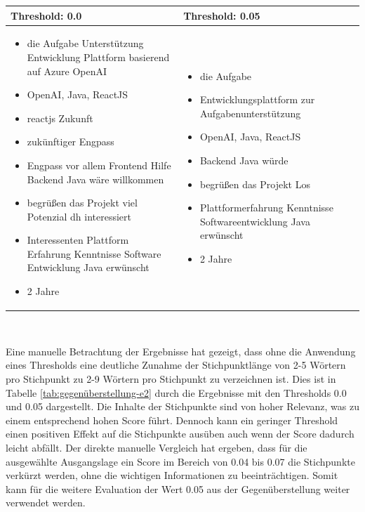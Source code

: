 \begin{center}
	\begin{tabularx}{1\textwidth} { 
			| >{\raggedright\arraybackslash}X 
			|| >{\raggedright\arraybackslash}X | }
		\hline
		Threshold: 0.0
		& Threshold: 0.05 \\
		\hline
		\begin{itemize}[topsep=0pt]
			\itemsep-0.5em
			\item die Aufgabe Unterstützung Entwicklung Plattform basierend auf Azure OpenAI
			\item OpenAI, Java, ReactJS
			\item reactjs Zukunft
			\item zukünftiger Engpass
			\item Engpass vor allem Frontend Hilfe Backend Java wäre willkommen
			\item begrüßen das Projekt viel Potenzial dh interessiert
			\item Interessenten Plattform Erfahrung Kenntnisse Software Entwicklung Java erwünscht
			\item 2 Jahre
		\end{itemize} & \begin{itemize}[topsep=0pt]
		\itemsep-0.5em
		\item die Aufgabe
		\item Entwicklungsplattform zur Aufgabenunterstützung
		\item OpenAI, Java, ReactJS
		\item Backend Java würde
		\item begrüßen das Projekt Los
		\item Plattformerfahrung Kenntnisse Softwareentwicklung Java erwünscht
		\item 2 Jahre
		\end{itemize}\\
		\hline
	\end{tabularx}\\
	\label{tab:gegenüberstellung-e2}
\end{center}
Eine manuelle Betrachtung der Ergebnisse hat gezeigt, dass ohne die Anwendung eines Thresholds eine deutliche Zunahme der Stichpunktlänge von 2-5 Wörtern pro Stichpunkt zu 2-9 Wörtern pro Stichpunkt zu verzeichnen ist. Dies ist in Tabelle \ref{tab:gegenüberstellung-e2} durch die Ergebnisse mit den Thresholds 0.0 und 0.05 dargestellt. Die Inhalte der Stichpunkte sind von hoher Relevanz, was zu einem entsprechend hohen Score führt. Dennoch kann ein geringer Threshold einen positiven Effekt auf die Stichpunkte ausüben auch wenn der Score dadurch leicht abfällt. Der direkte manuelle Vergleich hat ergeben, dass für die ausgewählte Ausgangslage ein Score im Bereich von 0.04 bis 0.07 die Stichpunkte verkürzt werden, ohne die wichtigen Informationen zu beeinträchtigen. Somit kann für die weitere Evaluation der Wert 0.05 aus der Gegenüberstellung weiter verwendet werden.
